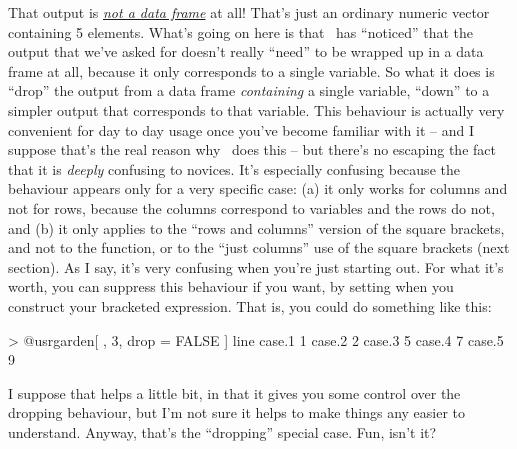 That output is \underline{\it not a data frame} at all! That's just an ordinary numeric vector containing 5 elements. What's going on here is that \R\ has ``noticed'' that the output that we've asked for doesn't really ``need'' to be wrapped up in a data frame at all, because it only corresponds to a single variable. So what it does is ``drop'' the output from a data frame {\it containing} a single variable, ``down'' to a simpler output that corresponds to that variable. This behaviour is actually very convenient for day to day usage once you've become familiar with it -- and I suppose that's the real reason why \R\ does this -- but there's no escaping the fact that it is {\it deeply} confusing to novices. It's especially confusing because the behaviour appears only for a very specific case: (a) it only works for columns and not for rows, because the columns correspond to variables and the rows do not, and (b) it only applies to the ``rows and columns'' version of the square brackets, and not to the  function, or to the ``just columns'' use of the square brackets (next section). As I say, it's very confusing when you're just starting out. For what it's worth, you can suppress this behaviour if you want, by setting  when you construct your bracketed expression. That is, you could do something like this:
\begin{rblock1}
> @usr{garden[ , 3, drop = FALSE ]}
       line
case.1    1
case.2    2
case.3    5
case.4    7
case.5    9
\end{rblock1}
I suppose that helps a little bit, in that it gives you some control over the dropping behaviour, but I'm not sure it helps to make things any easier to understand. Anyway, that's the ``dropping'' special case. Fun, isn't it?





